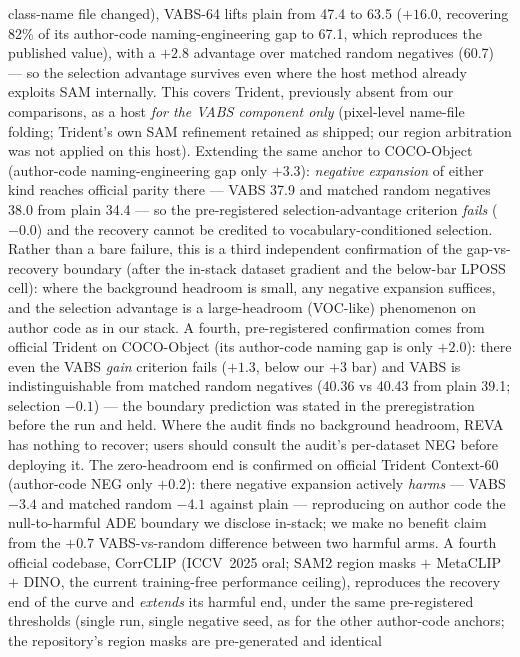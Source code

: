 \documentclass[11pt]{article}
\newcommand{\reva}{REVA}
\begin{document}
class-name file changed), VABS-64 lifts plain from 47.4 to 63.5 ($+16.0$,
recovering 82\% of its author-code naming-engineering gap to 67.1, which
reproduces the published value), with a $+2.8$ advantage over matched
random negatives (60.7) --- so the selection advantage survives even where
the host method already exploits SAM internally. This covers Trident,
previously absent from our comparisons, as a host \emph{for the VABS
component only} (pixel-level name-file folding; Trident's own SAM
refinement retained as shipped; our region arbitration was not applied on
this host). Extending the same anchor to COCO-Object (author-code
naming-engineering gap only $+3.3$): \emph{negative expansion} of either kind
reaches official parity there --- VABS 37.9 and matched random negatives 38.0
from plain 34.4 --- so the pre-registered selection-advantage criterion
\emph{fails} ($-0.0$) and the recovery cannot be credited to
vocabulary-conditioned selection. Rather than a bare failure, this is a third
independent confirmation of the gap-vs-recovery boundary (after the in-stack
dataset gradient and the below-bar LPOSS cell): where the background headroom
is small, any negative expansion suffices, and the selection advantage is a
large-headroom (VOC-like) phenomenon on author code as in our stack. A
fourth, pre-registered confirmation comes from official Trident on
COCO-Object (its author-code naming gap is only $+2.0$): there even the
VABS \emph{gain} criterion fails ($+1.3$, below our $+3$ bar) and VABS is
indistinguishable from matched random negatives (40.36 vs 40.43 from plain
39.1; selection $-0.1$) --- the boundary
prediction was stated in the preregistration before the run and held. Where
the audit finds no background headroom, \reva{} has nothing to recover;
users should consult the audit's per-dataset NEG before deploying it. The
zero-headroom end is confirmed on official Trident Context-60 (author-code
NEG only $+0.2$): there negative expansion actively \emph{harms} --- VABS
$-3.4$ and matched random $-4.1$ against plain --- reproducing on author
code the null-to-harmful ADE boundary we disclose in-stack; we make no
benefit claim from the $+0.7$ VABS-vs-random difference between two harmful
arms. A fourth official codebase, CorrCLIP \citep{zhang2025corrclip}
(ICCV~2025 oral; SAM2 region masks $+$ MetaCLIP $+$ DINO, the current
training-free performance ceiling), reproduces the recovery end of the
curve and \emph{extends} its harmful end, under the same pre-registered
thresholds (single run, single negative seed, as for the other author-code
anchors; the repository's region masks are pre-generated and identical
\end{document}
